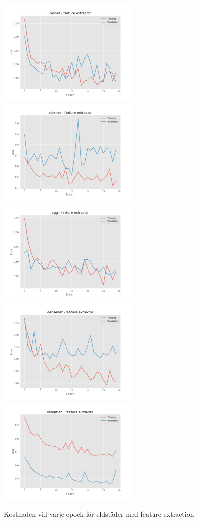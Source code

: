 \documentclass[]{kththesis}
\begin{document}
\begin{figure}[h]
  \includegraphics[width=7cm]{f_l_resnet_fe}
  \includegraphics[width=7cm]{f_l_alexnet_fe}
  \includegraphics[width=7cm]{f_l_vgg_fe}
  \includegraphics[width=7cm]{f_l_densenet_fe}
  \includegraphics[width=7cm]{f_l_inception_fe}
  \caption{Kostnaden vid varje epoch för eldstäder med feature extraction}
  \label{fig:f_l_1}
\end{figure}
\end{document}
